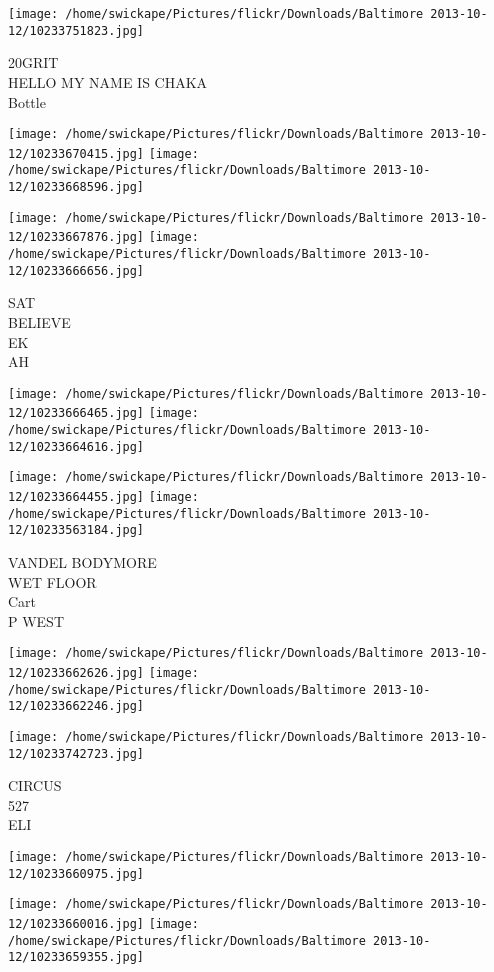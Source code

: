 \documentclass[10pt,letterpaper]{article}
\begin{document}
\vspace{0.25in}
\texttt{[image: /home/swickape/Pictures/flickr/Downloads/Baltimore 2013-10-12/10233751823.jpg]}

20GRIT\\
HELLO MY NAME IS CHAKA\\
Bottle
\pagebreak

\texttt{[image: /home/swickape/Pictures/flickr/Downloads/Baltimore 2013-10-12/10233670415.jpg]}
\texttt{[image: /home/swickape/Pictures/flickr/Downloads/Baltimore 2013-10-12/10233668596.jpg]}

\texttt{[image: /home/swickape/Pictures/flickr/Downloads/Baltimore 2013-10-12/10233667876.jpg]}
\texttt{[image: /home/swickape/Pictures/flickr/Downloads/Baltimore 2013-10-12/10233666656.jpg]}

SAT\\
BELIEVE\\
EK\\
AH
\pagebreak

\texttt{[image: /home/swickape/Pictures/flickr/Downloads/Baltimore 2013-10-12/10233666465.jpg]}
\texttt{[image: /home/swickape/Pictures/flickr/Downloads/Baltimore 2013-10-12/10233664616.jpg]}

\texttt{[image: /home/swickape/Pictures/flickr/Downloads/Baltimore 2013-10-12/10233664455.jpg]}
\texttt{[image: /home/swickape/Pictures/flickr/Downloads/Baltimore 2013-10-12/10233563184.jpg]}

VANDEL BODYMORE\\
WET FLOOR\\
Cart\\
P WEST
\pagebreak

\texttt{[image: /home/swickape/Pictures/flickr/Downloads/Baltimore 2013-10-12/10233662626.jpg]}
\texttt{[image: /home/swickape/Pictures/flickr/Downloads/Baltimore 2013-10-12/10233662246.jpg]}

\texttt{[image: /home/swickape/Pictures/flickr/Downloads/Baltimore 2013-10-12/10233742723.jpg]}

CIRCUS\\
527\\
ELI
\pagebreak

\texttt{[image: /home/swickape/Pictures/flickr/Downloads/Baltimore 2013-10-12/10233660975.jpg]}

\vspace{0.25in}
\texttt{[image: /home/swickape/Pictures/flickr/Downloads/Baltimore 2013-10-12/10233660016.jpg]}
\texttt{[image: /home/swickape/Pictures/flickr/Downloads/Baltimore 2013-10-12/10233659355.jpg]}
\end{document}
